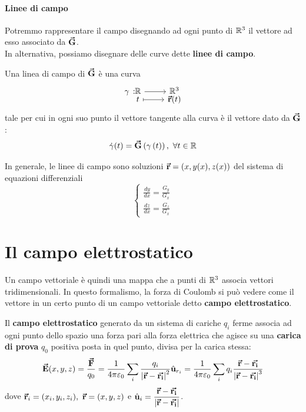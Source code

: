 \paragraph{Linee di campo}
Potremmo rappresentare il campo disegnando ad ogni punto di $\mathbb{R}^3$ il vettore ad esso associato da $\vb*{\va{G}}$.\\
In alternativa, possiamo disegnare delle curve dette \textbf{linee di campo}.
\begin{define}
	Una linea di campo di $\vb*{\va{G}}$ è una curva 
\begin{equation}
	\funztot[\gamma]{\realset}{\realset^3}{t}{\vba{r}(t)}
\end{equation}
tale per cui in ogni suo punto il vettore tangente alla curva è il vettore dato da $\vb*{\va{G}}$:
\begin{equation}
	\dot{\gamma}(t)=\vba{G}\left(\gamma\left(t\right)\right),\ \forall t\in\realset
\end{equation}
\end{define}
In generale, le linee di campo sono soluzioni $\vb*{\va{r}}=\left(x,y(x),z(x)\right)$ del sistema di equazioni differenziali
\begin{equation}
	\begin{cases}
		\frac{dy}{dx}=\frac{G_y}{G_x}\\
		\frac{dz}{dx}=\frac{G_z}{G_x}
	\end{cases}
\end{equation}
\section{Il campo elettrostatico}
Un campo vettoriale è quindi una mappa che a punti di $\mathbb{R}^3$ associa vettori tridimensionali.
In questo formalismo, la forza di Coulomb si può vedere come il vettore in un certo punto di un campo vettoriale detto \textbf{campo elettrostatico}.
\begin{define}
	Il \textbf{campo elettrostatico} generato da un sistema di cariche $q_i$ ferme associa ad ogni punto dello spazio una forza pari alla forza elettrica che agisce su una \textbf{carica di prova} $q_0$ positiva posta in quel punto, divisa per la carica stessa:
	\begin{equation}\label{campoelettrostatico}
		\vb*{\va{E}}(x,y,z)=\frac{\vb*{\va{F}}}{q_0}=\frac{1}{4\pi\varepsilon_0}\sum_i \frac{q_i}{\abs{\vb*{\va{r}}-\vb*{\va{r_i}}}^2}\hat{\mathbf{u}}_{r_i}=\frac{1}{4\pi\varepsilon_0}\sum_i q_i\frac{\vb*{\va{r}}-\vb*{\va{r_i}}}{\abs{\vb*{\va{r}}-\vb*{\va{r_i}}}^3}
	\end{equation}
	dove $\vba{r}_i=(x_i,y_i,z_i),\ \vba{r}=(x,y,z)$ e $\hat{\mathbf{u}}_i=\dfrac{\vb*{\va{r}}-\vb*{\va{r_i}}}{\abs{\vb*{\va{r}}-\vb*{\va{r_i}}}}$.
\end{define}
